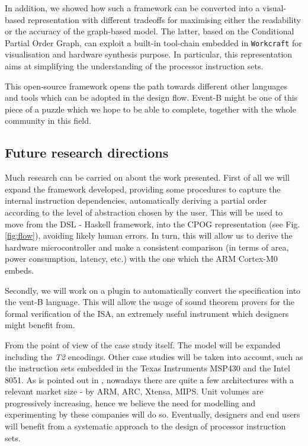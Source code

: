 \documentclass[conference]{IEEEtran}
\begin{document}
In addition, we showed how such a framework can be converted into a visual-based
representation with different tradeoffs for maximising either the readability or the accuracy
of the graph-based model. The latter, based on the Conditional Partial Order Graph, can
exploit a built-in tool-chain embedded in \verb|Workcraft| for visualisation and hardware
synthesis purpose. In particular, this representation aims at simplifying the understanding of
the processor instruction sets.

This open-source framework opens the path towards different other languages and tools which
can be adopted in the design flow. Event-B might be one of this piece of a puzzle which we
hope to be able to complete, together with the whole community in this field.

\subsection{Future research directions}
\label{sec:frd}
Much research can be carried on about the work presented. First of all we will expand the
framework developed, providing some procedures to capture the internal instruction
dependencies, automatically deriving a partial order according to the level of abstraction
chosen by the user. This will be used to move from the DSL - Haskell framework, into the CPOG
representation (see Fig. \ref{fig:flow}), avoiding likely human errors. In turn, this will
allow us to derive the hardware microcontroller and make a consistent comparison (in terms of
area, power consumption, latency, etc.) with the one which the ARM Cortex-M0 embeds.

Secondly, we will work on a plugin to automatically convert the specification into the
vent-B language. This will allow the usage of sound theorem provers for the formal
verification of the ISA, an extremely useful instrument which designers might benefit from.

From the point of view of the case study itself. The model will be expanded including the
\textit{T2} encodings. Other case studies will be taken into account, such as the instruction
sets embedded in the Texas Instruments MSP430 and the Intel 8051. As is pointed out in
\cite{webArticle}, nowadays there are quite a few architectures with a relevant market size -
by ARM, ARC, Xtensa, MIPS. Unit volumes are progressively increasing, hence we believe the
need for modelling and experimenting by these companies will do so. Eventually, designers and
end users will benefit from a systematic approach to the design of processor instruction sets.\\
\end{document}
